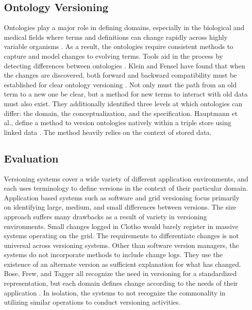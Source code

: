 \subsection{Ontology Versioning}

Ontologies play a major role in defining domains, especially in the biological and medical fields where terms and definitions can change rapidly across highly variable organisms \cite{Ochs:2015:SVS:2826733.2826866}.
As a result, the ontologies require consistent methods to capture and model changes to evolving terms.
Tools aid in the process by detecting differences between ontologies \cite{Hartung201315}.
Klein and Fensel have found that when the changes are discovered, both forward and backward compatibility must be established for clear ontology versioning \cite{Klein01ontologyversioning}.
Not only must the path from an old term to a new one be clear, but a method for new terms to interact with old data must also exist.
They additionally identified three levels at which ontologies can differ: the domain, the conceptualization, and the specification.
Hauptmann et al., define a method to version ontologies natively within a triple store using linked data \cite{HauptmannEtAl:LDQ2015} \cite{LDQ2015}.
The method heavily relies on the context of stored data.

\subsection{Evaluation}

Versioning systems cover a wide variety of different application environments, and each uses terminology to define versions in the context of their particular domain.
Application based systems such as software and grid versioning focus primarily on identifying large, medium, and small differences between versions.
The size approach suffers many drawbacks as a result of variety in versioning environments.
Small changes logged in Clotho would barely register in massive systems operating on the grid.
The requirements to differentiate changes is not universal across versioning systems.
Other than software version managers, the systems do not incorporate methods to include change logs.
They use the existence of an alternate version as sufficient explanation for what has changed.
Bose, Frew, and Tagger all recognize the need in versioning for a standardized representation, but each domain defines change according to the needs of their application \cite{Bose:2005:LRS:1057977.1057978} \cite{Tagger2005}.
In isolation, the systems to not recognize the commonality in utilizing similar operations to conduct versioning activities.

